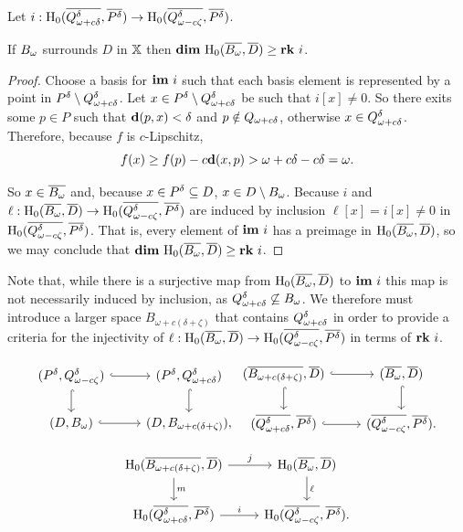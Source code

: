 \begin{lemma}\label{lem:psurj}
  Let $i : \mathrm{H}_0(\overline{Q_{\omega + c{\delta}}^{\delta}}, \overline{P^{\delta}})\to \mathrm{H}_0(\overline{Q_{\omega - c\zeta}^{\delta}}, \overline{P^\delta})$.

  If $B_{\omega}$ surrounds $D$ in $\mathbb{X}$ then $\mathbf{dim}~\mathrm{H}_0(\overline{B_{\omega}}, \overline{D})\geq \mathbf{rk}~i$.
\end{lemma}
\begin{proof}
  Choose a basis for $\mathbf{im}~i$ such that each basis element is represented by a point in $P^{\delta}\setminus Q_{\omega + c{\delta}}^{\delta}$.
  Let $x\in P^{\delta}\setminus Q_{\omega + c{\delta}}^{\delta}$ be such that $i[x] \neq 0$.
  So there exits some $p\in P$ such that $\mathbf{d}(p, x) < \delta$ and $p\notin Q_{\omega + c{\delta}}$, otherwise $x\in Q_{\omega + c{\delta}}^{\delta}$.
  Therefore, because $f$ is $c$-Lipschitz,
  \[ f(x)\geq f(p) - c\mathbf{d}(x, p) > \omega + c{\delta} - c{\delta} =\omega.\]

  So $x\in\overline{B_{\omega}}$ and, because $x\in P^{\delta}\subseteq D$, $x\in D\setminus B_{\omega}$.
  Because $i$ and $\ell : \mathrm{H}_0(\overline{B_{\omega}}, \overline{D})\to \mathrm{H}_0(\overline{Q_{\omega - c\zeta}^{\delta}}, \overline{P^{\delta}})$ are induced by inclusion $\ell[x] = i[x]\neq 0$ in $\mathrm{H}_0(\overline{Q_{\omega - c\zeta}^{\delta}}, \overline{P^{\delta}})$.
  That is, every element of $\mathbf{im}~i$ has a preimage in $\mathrm{H}_0(\overline{B_{\omega}}, \overline{D})$, so we may conclude that $\mathbf{dim}~\mathrm{H}_0(\overline{B_{\omega}}, \overline{D})\geq \mathbf{rk}~i$.
\end{proof}

Note that, while there is a surjective map from $\mathrm{H}_0(\overline{B_{\omega}}, \overline{D})$ to $\mathbf{im}~i$ this map is not necessarily induced by inclusion, as $Q_{\omega + c{\delta}}^{\delta}\not\subseteq B_{\omega}$.
We therefore must introduce a larger space $B_{\omega+c(\delta+\zeta)}$ that contains $Q_{\omega + c{\delta}}^{\delta}$ in order to provide a criteria for the injectivity of $\ell : \mathrm{H}_0(\overline{B_{\omega}}, \overline{D})\to\mathrm{H}_0(\overline{Q_{\omega - c\zeta}^{\delta}}, \overline{P^{\delta}})$ in terms of $\mathbf{rk}~i$.

\[ \begin{tikzcd}
  (P^\of, \Q^\of) \arrow[hookrightarrow]{r}\arrow[hookrightarrow]{d} &
  (P^\of, \QQ^\of) \arrow[hookrightarrow]{d} \\
  (D, \bb) \arrow[hookrightarrow]{r} &
  (D, B_{\omega+c(\delta+\zeta)}),
\end{tikzcd}\begin{tikzcd}
  (\cmp{B_{\omega+c(\delta+\zeta)}},\cmp{D})\arrow[hookrightarrow]{d}\arrow[hookrightarrow]{r} &
  (\cmp{\bb}, \cmp{D}) \arrow[hookrightarrow]{d}\\
  (\cmp{\QQ^\of}, \cmp{P^\of}) \arrow[hookrightarrow]{r} &
  (\cmp{\Q^\of}, \cmp{P^\of}).
\end{tikzcd}\]

\begin{equation}\label{dgm:1}\begin{tikzcd}
  \hom_0(\cmp{B_{\omega+c(\delta+\zeta)}},\cmp{D})\arrow{d}{m} \arrow{r}{j} &
  \hom_0(\cmp{\bb}, \cmp{D}) \arrow{d}{\ell} \\
  \hom_0(\cmp{\QQ^\of}, \cmp{P^\of}) \arrow{r}{i} &
  \hom_0(\cmp{\Q^\of}, \cmp{P^\of}).
\end{tikzcd}\end{equation}


